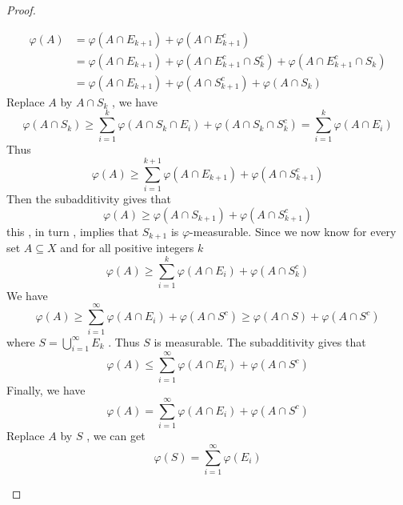 \documentclass[../main.tex]{subfiles}
\begin{document}
\begin{proof}
\begin{enumerate}
\[        \begin{aligned}
         \varphi \left( A \right)&=  \varphi \left( A\cap E_{k+ 1} \right)+  \varphi \left( A\cap E_{k+ 1}^{c} \right)\\ 
          &=  \varphi \left( A\cap E_{k+ 1} \right)+  \varphi \left( A\cap E_{k+ 1}^{c}\cap S_{k}^{c} \right)+  \varphi \left( A\cap E_{k+ 1}^{c}\cap S_{k} \right)\\ 
           &=  \varphi \left( A\cap E_{k+ 1} \right)+  \varphi \left( A\cap S_{k+ 1}^{c} \right)+  \varphi \left( A\cap S_{k} \right)        
        \end{aligned}
        \]  Replace \(  A  \) by \(  A\cap S_{k}  \) , we have \[
         \varphi \left( A\cap S_{k} \right)\ge \sum _{i = 1}^{k} \varphi \left( A\cap S_{k}\cap E_{i} \right)+  \varphi \left( A\cap S_{k}\cap S_{k}^{c} \right)=     \sum _{i = 1}^{k} \varphi \left( A\cap E_{i} \right) 
        \]   Thus \[
         \varphi \left( A \right) \ge \sum _{i = 1}^{k+ 1} \varphi \left( A\cap E_{k+ 1} \right)+  \varphi \left( A\cap S_{k+ 1}^{c} \right)  
        \] Then the subadditivity gives that \[
         \varphi \left( A \right)\ge   \varphi \left( A\cap S_{k+ 1} \right)+  \varphi \left( A\cap S_{k+ 1}^{c} \right)   
        \] this , in turn , implies that \(  S_{k+ 1}  \) is \(   \varphi   \)-measurable. Since we now know  for every set \(  A\subseteq X  \) and for all positive integers \(  k  \) \[
         \varphi \left( A \right)\ge \sum _{i = 1}^{k} \varphi \left( A\cap E_{i} \right)+  \varphi \left( A\cap S_{k}^{c} \right)   
        \]     We have \[
         \varphi \left( A \right)\ge \sum _{i = 1}^{\infty} \varphi \left( A\cap E_{i} \right)+  \varphi \left( A\cap S^{c} \right)  \ge  \varphi \left( A\cap S \right)+  \varphi \left( A\cap S^{c} \right)   
        \] where \(  S= \bigcup _{i = 1}^{\infty}E_{k}  \) .  Thus \(  S  \) is measurable.   The subadditivity gives that \[
         \varphi \left( A \right)\le \sum _{i= 1}^{\infty} \varphi \left( A\cap E_{i} \right)+  \varphi \left( A\cap S^{c} \right)   
        \]Finally, we have \[
         \varphi \left( A \right)= \sum _{i= 1}^{\infty} \varphi \left( A\cap E_{i} \right)+  \varphi \left( A\cap S^{c} \right)   
        \] Replace \(  A  \) by \(  S  \) , we can get \[
         \varphi \left( S \right)= \sum _{i= 1}^{\infty} \varphi \left( E_{i} \right)  
        \]  
    \end{enumerate}
    
\end{proof}
\end{document}
